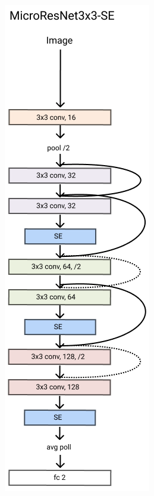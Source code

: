 \documentclass[../document.tex]{subfiles}
\begin{document}
\begin{figure}[htbp]
\begin{subfigure}[b]{0.22\textwidth}
    \end{subfigure}
    \begin{subfigure}[b]{0.22\textwidth}
        \includegraphics[width=\textwidth]{../img/3/models/transparent-microresnet3x3-se.png}

\end{subfigure}
\end{figure}
\end{document}
